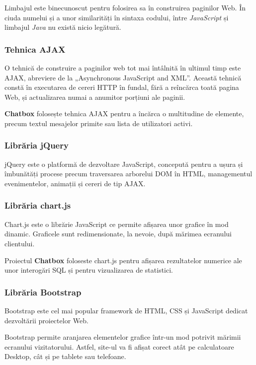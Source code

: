 \documentclass[12pt,a4paper]{article}
\begin{document}
Limbajul este binecunoscut pentru folosirea sa în construirea paginilor Web. În ciuda numelui și a unor similarități în sintaxa codului, între \textit{JavaScript} și limbajul \textit{Java} nu există nicio legătură.

\subsubsection{Tehnica AJAX}
O tehnică de construire a paginilor web tot mai întâlnită în ultimul timp este AJAX, abreviere de la „Asynchronous JavaScript and XML”. Această tehnică constă în executarea de cereri HTTP în fundal, fără a reîncărca toată pagina Web, și actualizarea numai a anumitor porțiuni ale paginii.

\textbf{Chatbox} folosește tehnica AJAX pentru a încărca o multitudine de
elemente, precum textul mesajelor primite sau lista de utilizatori activi. 

\subsubsection{Librăria jQuery}
jQuery\citep{jquery} este o platformă de dezvoltare JavaScript, concepută pentru a ușura și îmbunătăți procese precum traversarea arborelui DOM\citep{dom} în HTML, managementul evenimentelor, animații și cereri de tip AJAX.

\subsubsection{Librăria chart.js}
Chart.js\cite{chartjs} este o librărie JavaScript ce permite afișarea 
unor grafice în mod dinamic. Graficele sunt redimensionate, la nevoie, după 
mărimea ecranului clientului. 

Proiectul \textbf{Chatbox} foloseste chart.js pentru afișarea rezultatelor
numerice ale unor interogări SQL și pentru vizualizarea de statistici.

\subsubsection{Librăria Bootstrap}
Bootstrap este cel mai popular framework de HTML, CSS și JavaScript dedicat dezvoltării proiectelor Web. 

Bootstrap permite aranjarea elementelor grafice într-un mod potrivit mărimii ecranului vizitatorului. Astfel, site-ul va fi afișat corect atât pe calculatoare Desktop, cât și pe tablete sau telefoane.
\end{document}

